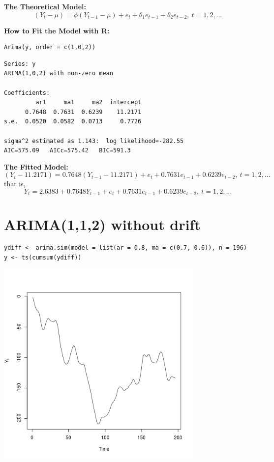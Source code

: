 \documentclass[12pt]{article}
\begin{document}
\noindent
\textbf{The Theoretical Model:} 
\[
(Y_{t} - \mu) = \phi(Y_{t - 1} - \mu) +  e_{t} + \theta_{1} e_{t - 1} + \theta_{2} e_{t - 2},\ t = 1,2,\ldots
\]

\noindent
\textbf{How to Fit the Model with R:}


\begin{verbatim}
Arima(y, order = c(1,0,2))
\end{verbatim}




\begin{verbatim}
Series: y 
ARIMA(1,0,2) with non-zero mean 

Coefficients:
         ar1     ma1     ma2  intercept
      0.7648  0.7631  0.6239    11.2171
s.e.  0.0520  0.0582  0.0713     0.7726

sigma^2 estimated as 1.143:  log likelihood=-282.55
AIC=575.09   AICc=575.42   BIC=591.3
\end{verbatim}

\noindent
\textbf{The Fitted Model:} 
\[
(Y_{t} - 11.2171 ) = 0.7648 (Y_{t - 1} - 11.2171 ) + e_{t} + 0.7631 e_{t - 1} + 0.6239 e_{t - 2},\ t = 1,2,\ldots
\]
that is,
\[
Y_{t} = 2.6383 + 0.7648 Y_{t - 1} + e_{t} + 0.7631 e_{t - 1} + 0.6239 e_{t - 2},\ t = 1,2,\ldots
\]
\section*{ARIMA(1,1,2) without drift}
\label{sec-7}


\begin{verbatim}
ydiff <- arima.sim(model = list(ar = 0.8, ma = c(0.7, 0.6)), n = 196)
y <- ts(cumsum(ydiff))
\end{verbatim}





\includegraphics[width=4.0in]{img/arima112zm.png}
\end{document}
